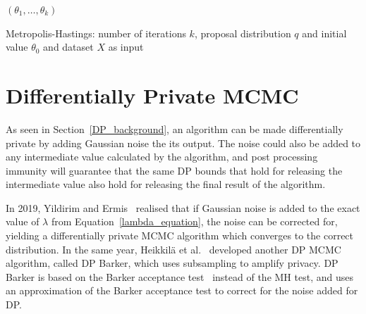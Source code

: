\documentclass[english,twoside,openright]{HYgraduMLDS}
\begin{document}
\begin{algorithm}[H]\label{MH_algo}
    \SetAlgoLined
    \Return \((\theta_1, \dotsc, \theta_k)\)
    \caption{
        Metropolis-Hastings: number of iterations \(k\), proposal 
        distribution \(q\) and initial value \(\theta_0\) and 
        dataset \(X\) as input
    }
\end{algorithm}


\chapter{Differentially Private MCMC}

As seen in Section~\ref{DP_background}, an algorithm can be made differentially 
private by adding Gaussian noise the its output. The noise could also be added 
to any intermediate value calculated by the algorithm, and post processing immunity 
will guarantee that the same DP bounds that hold for releasing the intermediate 
value also hold for releasing the final result of the algorithm.

In 2019, Yildirim and Ermis~\cite{YildirimE19} realised that if Gaussian noise
is added to the exact value of \(\lambda\) from Equation~\ref{lambda_equation},
the noise can be corrected for,
yielding a differentially private MCMC algorithm which converges to 
the correct distribution. In the same year, Heikkilä et al.~\cite{HeikkilaJDH19}
developed another DP MCMC algorithm, called DP Barker, which uses subsampling 
to amplify privacy. DP Barker is based on the Barker acceptance
test~\cite{Barker65} instead of the MH test, and uses an approximation
of the Barker acceptance test to correct for the noise added for DP.
\end{document}

